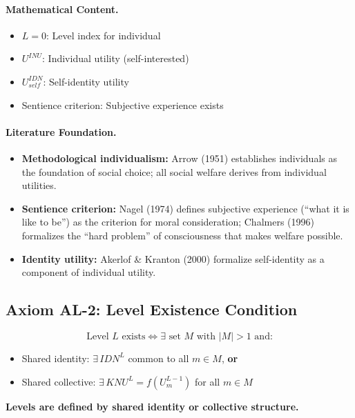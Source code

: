 \paragraph{Mathematical Content.}
\begin{itemize}
\item $L = 0$: Level index for individual
\item $U^{INU}$: Individual utility (self-interested)
\item $U^{IDN}_{self}$: Self-identity utility
\item Sentience criterion: Subjective experience exists
\end{itemize}

\paragraph{Literature Foundation.}
\begin{itemize}
\item \textbf{Methodological individualism:} Arrow (1951) establishes individuals as 
the foundation of social choice; all social welfare derives from individual utilities.
\item \textbf{Sentience criterion:} Nagel (1974) defines subjective experience 
(``what it is like to be'') as the criterion for moral consideration; Chalmers (1996) 
formalizes the ``hard problem'' of consciousness that makes welfare possible.
\item \textbf{Identity utility:} Akerlof \& Kranton (2000) formalize self-identity 
as a component of individual utility.
\end{itemize}

\subsection{Axiom AL-2: Level Existence Condition}

\begin{tcolorbox}[colback=gray!5!white, colframe=gray!75!black, title=Axiom AL-2: Level Existence]
\begin{equation}
\boxed{
\text{Level } L \text{ exists} \iff \exists \text{ set } M \text{ with } |M| > 1 \text{ and:}
}
\end{equation}
\begin{itemize}
\item[(a)] Shared identity: $\exists \, IDN^L$ common to all $m \in M$, \textbf{or}
\item[(b)] Shared collective: $\exists \, KNU^L = f(U^{L-1}_m)$ for all $m \in M$
\end{itemize}
\textbf{Levels are defined by shared identity or collective structure.}
\end{tcolorbox}

